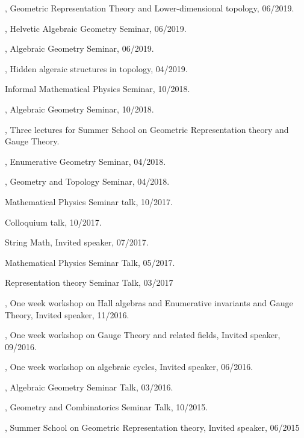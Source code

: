 \documentclass[11pt]{amsart}
\theoremstyle{plain}
\theoremstyle{definition}
\theoremstyle{remark}
\begin{document}
\medskip

, Geometric Representation Theory and Lower-dimensional topology, 06/2019.

,  Helvetic Algebraic Geometry Seminar, 06/2019.

, Algebraic Geometry Seminar, 06/2019.

, Hidden algeraic structures in topology, 04/2019.

 Informal Mathematical Physics Seminar, 10/2018.

, Algebraic Geometry Seminar, 10/2018.

, Three lectures for Summer School on Geometric Representation theory and
Gauge Theory.

, Enumerative Geometry Seminar, 04/2018.

, Geometry and  Topology Seminar, 04/2018.

 Mathematical Physics Seminar talk, 10/2017.

 Colloquium talk, 10/2017.

 String Math, Invited speaker, 07/2017.

 Mathematical Physics Seminar Talk, 05/2017.

 Representation theory Seminar Talk, 03/2017

, One week workshop on Hall algebras and Enumerative invariants and Gauge Theory, Invited speaker, 11/2016.

, One week workshop on Gauge Theory and related fields, Invited speaker, 09/2016.

, One week workshop on algebraic cycles, Invited speaker, 06/2016.

, Algebraic Geometry Seminar Talk, 03/2016.


, Geometry and Combinatorics Seminar Talk, 10/2015.

, Summer School on Geometric Representation theory, Invited speaker, 06/2015
\end{document}
